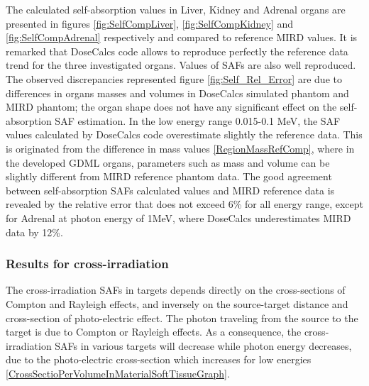 \documentclass[letterpaper,12pt]{article}
\begin{document}
The calculated self-absorption values in Liver, Kidney and Adrenal organs are presented in figures \ref{fig:SelfCompLiver}, \ref{fig:SelfCompKidney} and \ref{fig:SelfCompAdrenal} respectively and compared to reference MIRD values. It is remarked that DoseCalcs code allows to reproduce perfectly the reference data trend for the three investigated organs. Values of SAFs are also well reproduced. The observed discrepancies represented figure \ref{fig:Self_Rel_Error} are due to differences in organs masses and volumes in DoseCalcs simulated phantom and MIRD phantom; the organ shape does not have any significant effect on the self-absorption SAF estimation. In the low energy range 0.015-0.1 MeV, the SAF values calculated by DoseCalcs code overestimate slightly the reference data. This is originated from the difference in mass values \ref{RegionMassRefComp}, where in the developed GDML organs, parameters such as mass and volume can be slightly different from MIRD reference phantom data. The good agreement between self-absorption SAFs calculated values and MIRD reference data is revealed by the relative error that does not exceed 6\% for all energy range, except for Adrenal at photon energy of 1MeV, where DoseCalcs underestimates MIRD data by 12\%.

\subsubsection{Results for cross-irradiation}

The cross-irradiation SAFs in targets depends directly on the cross-sections of Compton and Rayleigh effects, and inversely on the source-target distance and cross-section of photo-electric effect. The photon traveling from the source to the target is due to Compton or Rayleigh effects. As a consequence, the cross-irradiation SAFs in various targets will decrease while photon energy decreases, due to the photo-electric cross-section which increases for low energies \ref{CrossSectioPerVolumeInMaterialSoftTissueGraph}.
\end{document}
